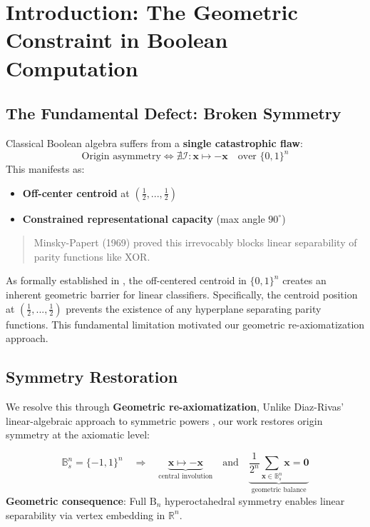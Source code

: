 \documentclass{article}
\begin{document}



\section{Introduction: The Geometric Constraint in Boolean Computation}

\subsection{The Fundamental Defect: Broken Symmetry}
Classical Boolean algebra suffers from a \textbf{single catastrophic flaw}:
\begin{equation}
\text{Origin asymmetry} \iff \nexists \mathcal{I}: \mathbf{x} \mapsto -\mathbf{x} \quad \text{over } \{0,1\}^n
\end{equation}
This manifests as:
\begin{itemize}
\item \textbf{Off-center centroid} at $(\frac{1}{2},...,\frac{1}{2})$
\item \textbf{Constrained representational capacity} (max angle $90^\circ$)
\end{itemize}

\begin{quote}
Minsky-Papert (1969) proved this irrevocably blocks linear separability of parity functions like XOR.
\end{quote}

As formally established in \cite{minsky69perceptrons}, the off-centered centroid in $\{0,1\}^n$ creates an inherent geometric barrier for linear classifiers. Specifically, the centroid position at $(\frac{1}{2},...,\frac{1}{2})$ prevents the existence of any hyperplane separating parity functions. This fundamental limitation motivated our geometric re-axiomatization approach.

\subsection{Symmetry Restoration}
We resolve this through \textbf{Geometric re-axiomatization}, Unlike Diaz-Rivas' linear-algebraic approach to symmetric powers \cite{diaz2006symmetricbooleanalgebras}, our work restores origin symmetry at the axiomatic level:

\begin{equation}
\mathbb{B}_s^n = \{-1,1\}^n \quad \Rightarrow \quad \underbrace{\mathbf{x} \mapsto -\mathbf{x}}_{\text{central involution}} \quad \text{and} \quad \underbrace{\frac{1}{2^n}\sum_{\mathbf{x}\in\mathbb{B}_s^n}\mathbf{x} = \mathbf{0}}_{\text{geometric balance}}
\end{equation}
\textbf{Geometric consequence}:  Full $\mathrm{B}_n$ hyperoctahedral symmetry enables linear separability via vertex embedding in $\mathbb{R}^n$.
\end{document}
